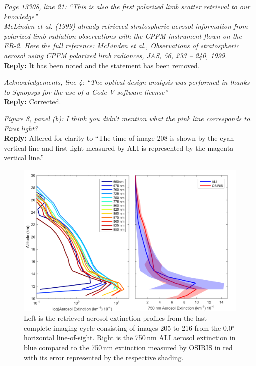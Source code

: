 \documentclass[12pt, notitlepage]{article}
\begin{document}
\textit{Page 13308, line 21: ``This is also the first polarized limb scatter retrieval to our knowledge''}\\

\textit{McLinden et al. (1999) already retrieved stratospheric aerosol information from polarized
limb radiation observations with the CPFM instrument flown on the ER-2. Here
the full reference: McLinden et al., Observations of stratospheric aerosol using CPFM
polarized limb radiances, JAS, 56, 233 – 240, 1999.}\\

\textbf{Reply:} It has been noted and the statement has been removed.

\hrulefill

\textit{Acknowledgements, line 4: ``The optical design analysis was performed in thanks to Synopsys for the use of a Code V software license''}\\

\textbf{Reply:} Corrected.

\hrulefill

\textit{Figure 8, panel (b): I think you didn't mention what the pink line corresponds to. First
light?}\\

\textbf{Reply:} Altered for clarity to ``The time of image 208 is shown by the
  cyan vertical line and first light measured by ALI is represented by the
  magenta vertical line.''

\hrulefill

\begin{figure}
\includegraphics[width=120mm]{amt-2015-329-discussions-f12.pdf}
\caption{Left is the retrieved aerosol extinction profiles from the
  last complete imaging cycle consisting of images 205 to 216 from the
  0.0$^{\circ}$ horizontal line-of-sight. Right is the 750\,nm
  ALI aerosol extinction in blue compared to the 750\,nm extinction measured by OSIRIS
  in red with its error represented by the respective
  shading.}
\label{amtd-2015-0329-f12.pdf}
\end{figure}
\end{document}
